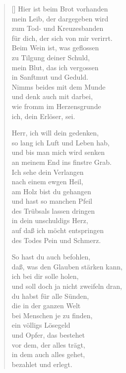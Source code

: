 \begin{multicols}{2}
\begin{verse}[\versewidth]
 Hier ist beim Brot vorhanden\\
mein Leib, der dargegeben wird\\
zum Tod- und Kreuzesbanden\\
für dich, der sich von mir verirrt.\\
Beim Wein ist, was geflossen\\
zu Tilgung deiner Schuld,\\
mein Blut, das ich vergossen\\
in Sanftmut und Geduld.\\
Nimms beides mit dem Munde\\
und denk auch mit darbei,\\
wie fromm im Herzensgrunde\\
ich, dein Erlöser, sei.

 Herr, ich will dein gedenken,\\
so lang ich Luft und Leben hab,\\
und bis man mich wird senken\\
an meinem End ins finstre Grab.\\
Ich sehe dein Verlangen\\
nach einem ewgen Heil,\\
am Holz bist du gehangen\\
und hast so manchen Pfeil\\
des Trübsals lassen dringen\\
in dein unschuldigs Herz,\\
auf daß ich möcht entspringen\\
des Todes Pein und Schmerz.

 So hast du auch befohlen,\\
daß, was den Glauben stärken kann,\\
ich bei dir solle holen,\\
und soll doch ja nicht zweifeln dran,\\
du habst für alle Sünden,\\
die in der ganzen Welt\\
bei Menschen je zu finden,\\
ein völligs Lösegeld\\
und Opfer, das bestehet\\
vor dem, der alles trägt,\\
in dem auch alles gehet,\\
bezahlet und erlegt.


\end{verse}
\end{multicols}
